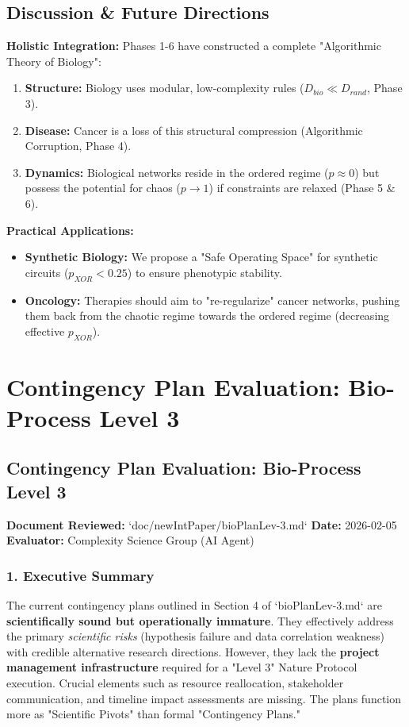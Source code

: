 \documentclass{article}
\begin{document}
\subsection{Discussion \& Future Directions}
\textbf{Holistic Integration:}
Phases 1-6 have constructed a complete "Algorithmic Theory of Biology":
\begin{enumerate}
    \item \textbf{Structure:} Biology uses modular, low-complexity rules ($D_{bio} \ll D_{rand}$, Phase 3).
    \item \textbf{Disease:} Cancer is a loss of this structural compression (Algorithmic Corruption, Phase 4).
    \item \textbf{Dynamics:} Biological networks reside in the ordered regime ($p \approx 0$) but possess the potential for chaos ($p \to 1$) if constraints are relaxed (Phase 5 \& 6).
\end{enumerate}
\textbf{Practical Applications:}
\begin{itemize}
    \item \textbf{Synthetic Biology:} We propose a "Safe Operating Space" for synthetic circuits ($p_{XOR} < 0.25$) to ensure phenotypic stability.
    \item \textbf{Oncology:} Therapies should aim to "re-regularize" cancer networks, pushing them back from the chaotic regime towards the ordered regime (decreasing effective $p_{XOR}$).
\end{itemize}






\section{Contingency Plan Evaluation: Bio-Process Level 3}
\subsection{Contingency Plan Evaluation: Bio-Process Level 3}

\textbf{Document Reviewed:} `doc/newIntPaper/bioPlanLev-3.md`
\textbf{Date:} 2026-02-05
\textbf{Evaluator:} Complexity Science Group (AI Agent)

\subsubsection{1. Executive Summary}
The current contingency plans outlined in Section 4 of `bioPlanLev-3.md` are \textbf{scientifically sound but operationally immature}. They effectively address the primary \textit{scientific risks} (hypothesis failure and data correlation weakness) with credible alternative research directions. However, they lack the \textbf{project management infrastructure} required for a "Level 3" Nature Protocol execution. Crucial elements such as resource reallocation, stakeholder communication, and timeline impact assessments are missing. The plans function more as "Scientific Pivots" than formal "Contingency Plans."
\end{document}
